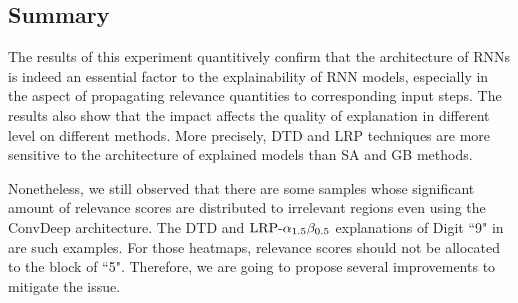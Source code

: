 \subsection{Summary}
The results of this experiment quantitively confirm that the architecture of RNNs is indeed an essential factor to the explainability of RNN models, especially in the aspect of propagating relevance quantities to corresponding input steps.  The results also show that the impact affects the quality of explanation in different level on different methods. More precisely, DTD and LRP techniques are more sensitive to the architecture of explained models than SA and GB methods.

Nonetheless, we  still observed that there are some samples whose significant amount of relevance scores are distributed to irrelevant regions even using the ConvDeep architecture. The DTD and $\text{LRP-}\alpha_{1.5}\beta_{0.5}$ explanations of Digit ``9" in \addfigure{\ref{fig:heatmap_msc_mix_for_thesis}} are such examples. For those heatmaps, relevance scores should not be allocated to the block of ``5".   Therefore, we are going to propose several improvements to mitigate the issue.


